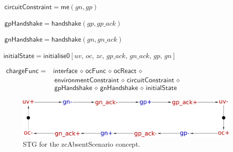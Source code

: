 \documentclass[british,compsoc]{IEEEtran}
\begin{document}
\begin{minipage}[h]{1\columnwidth}
\begin{flushleft}
$\,\mathsf{\mathsf{circuitConstraint}}=\mathsf{me}(gn, gp)$
\par\end{flushleft}

\begin{flushleft}
$\,\mathsf{gpHandshake}=\mathsf{handshake}(gp, gp\_ack)$
\par\end{flushleft}

\begin{flushleft}
$\,\mathsf{gnHandshake}=\mathsf{handshake}(gn, gn\_ack)$
\par\end{flushleft}

\begin{flushleft}
$\mathsf{initialState}=\mathsf{initialise0}[uv,\, oc,\, zc,\, gp\_ack,\, gn\_ack,\, gp,\, gn]$
\par\end{flushleft}

\begin{flushleft}
$\begin{aligned}\mathsf{chargeFunc}= & \mathsf{interface}\,\diamond\,\mathsf{ocFunc}\,\diamond\,\mathsf{ocReact}\,\diamond\\
 & \mathsf{\mathsf{\, environmentConstraint}\,\diamond\, circuitConstraint}\,\diamond\,\\
 & \mathsf{\, gpHandshake}\,\diamond\,\mathsf{gnHandshake}\,\diamond\,\mathsf{initialState}
\end{aligned}
$
\par\end{flushleft}


\end{minipage}

\begin{flushleft}
\begin{figure}[H]
\begin{centering}
\includegraphics[scale=0.22]{Images/stg-UV_without_ZC}
\par\end{centering}

\protect\caption{\label{fig:zcAbsentScenario STG} STG for the \textsf{zcAbsentScenario}
concept.}
\end{figure}

\par\end{flushleft}
\end{document}
